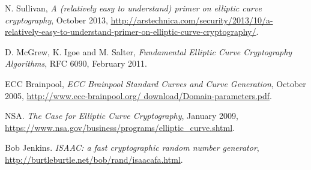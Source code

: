 \documentclass[ %
                    author={Nicholas Tutte},
                supervisor={Prof. Nigel Smart},
                    degree={MEng},
                     title={Secure Two Party Computation},
                  subtitle={A practical comparison of recent protocols},
                      type={Research - GG1K},
                      year={2015} ]{dissertation}
\begin{document}
\begin{thebibliography}{99}
			N. Sullivan,
			\emph{A (relatively easy to understand) primer on elliptic curve cryptography},
			October 2013,
			\url{http://arstechnica.com/security/2013/10/a-relatively-easy-to-understand-primer-on-elliptic-curve-cryptography/}.

			D. McGrew, K. Igoe and M. Salter,
			\emph{Fundamental Elliptic Curve Cryptography Algorithms},
			RFC 6090,
			February 2011.

			ECC Brainpool, \emph{ECC Brainpool Standard Curves and Curve Generation},
			October 2005, \url{http://www.ecc-brainpool.org/
			download/Domain-parameters.pdf}.

			NSA. \emph{The Case for Elliptic Curve Cryptography}, January 2009,
			\url{https://www.nsa.gov/business/programs/elliptic_curve.shtml}.
			
			Bob Jenkins. \emph{ISAAC: a fast cryptographic random number generator},
			\url{http://burtleburtle.net/bob/rand/isaacafa.html}.

	\end{thebibliography}
\end{document}
